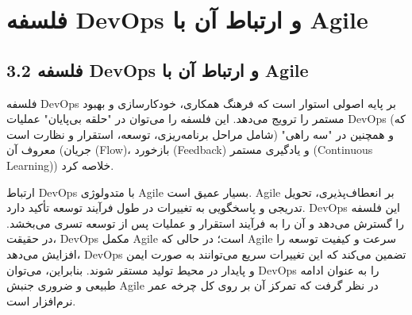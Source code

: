 \section{فلسفه DevOps و ارتباط آن با Agile}
\subsection*{3.2 فلسفه DevOps و ارتباط آن با Agile}
فلسفه DevOps بر پایه اصولی استوار است که فرهنگ همکاری، خودکارسازی و بهبود مستمر را ترویج می‌دهد. این فلسفه را می‌توان در "حلقه بی‌پایان" عملیات DevOps (که شامل مراحل برنامه‌ریزی، توسعه، استقرار و نظارت است) و همچنین در "سه راهی" معروف آن (جریان (Flow)، بازخورد (Feedback) و یادگیری مستمر (Continuous Learning)) خلاصه کرد.

ارتباط DevOps با متدولوژی Agile بسیار عمیق است. Agile بر انعطاف‌پذیری، تحویل تدریجی و پاسخگویی به تغییرات در طول فرآیند توسعه تأکید دارد. DevOps این فلسفه را گسترش می‌دهد و آن را به فرآیند استقرار و عملیات پس از توسعه تسری می‌بخشد. در حقیقت، DevOps مکمل Agile است؛ در حالی که Agile سرعت و کیفیت توسعه را افزایش می‌دهد، DevOps تضمین می‌کند که این تغییرات سریع می‌توانند به صورت ایمن و پایدار در محیط تولید مستقر شوند. بنابراین، می‌توان DevOps را به عنوان ادامه طبیعی و ضروری جنبش Agile در نظر گرفت که تمرکز آن بر روی کل چرخه عمر نرم‌افزار است.

